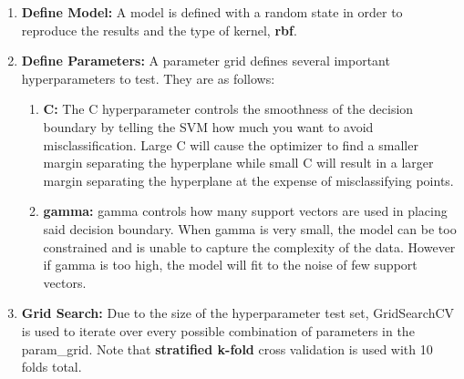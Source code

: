\documentclass[11pt]{article}
\begin{document}
	\begin{enumerate}
		\item \textbf{Define Model:} A model is defined with a random state in order to reproduce the results and the type of kernel, \textbf{rbf}.
		\item \textbf{Define Parameters:} A parameter grid defines several important hyperparameters to test. They are as follows:
		\begin{enumerate}
			\item \textbf{C:} The C hyperparameter controls the smoothness of the decision boundary by telling the SVM  how much you want to avoid misclassification. Large C will cause the optimizer to find a smaller margin separating the hyperplane while small C will result in a larger margin separating the hyperplane at the expense of misclassifying points.
			\item \textbf{gamma:} gamma controls how many support vectors are used in placing said decision boundary. When gamma is very small, the model can be too constrained and is unable to capture the complexity of the data. However if gamma is too high, the model will fit to the noise of few support vectors.
		\end{enumerate}
		\item \textbf{Grid Search:} Due to the size of the hyperparameter test set, GridSearchCV is used to iterate over every possible combination of parameters in the param\_grid. Note that \textbf{stratified k-fold} cross validation is used with 10 folds total. 
	\end{enumerate}	
\end{document}
